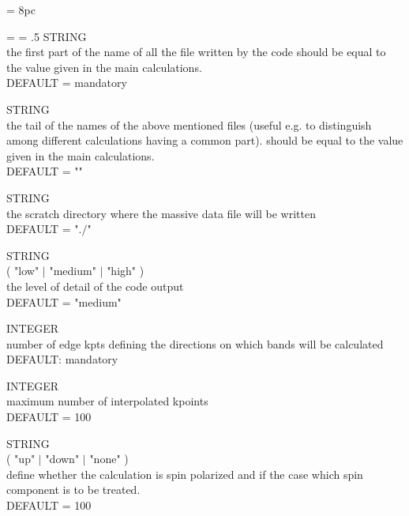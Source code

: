 \newdimen\descindent \descindent = 8pc
{\noindent \leftskip = \descindent \parskip = .5\baselineskip
{}%
STRING \\ the first part of the name of all the file written by the code
              should be equal to the value given in the main calculations.\\
              DEFAULT = mandatory \par

\noindent{}%
STRING \\ the tail of the names of the above mentioned files (useful e.g. to
              distinguish among different calculations having a common part).
              should be equal to the value given in the main calculations.\\
              DEFAULT = "" \par

\noindent{}%
STRING \\ the scratch directory where the massive data file will be written\\
              DEFAULT = "$./$" \par

\noindent{}%
STRING \\ ( "low" $\mid$ "medium" $\mid$ "high" )\\
              the level of detail of the code output\\
              DEFAULT =  "medium" \par

\noindent{}%
INTEGER \\ number of edge kpts defining the directions on which bands will
              be calculated\\ DEFAULT: mandatory \par

\noindent{}%
INTEGER \\ maximum number of interpolated kpoints\\ DEFAULT = 100 \par

\noindent{}%
STRING \\  ( "up" $\mid$ "down" $\mid$ "none" )\\
              define whether the calculation is spin polarized and if the case
              which spin component is to be treated.\\ DEFAULT = 100 \par
}\bigskip

